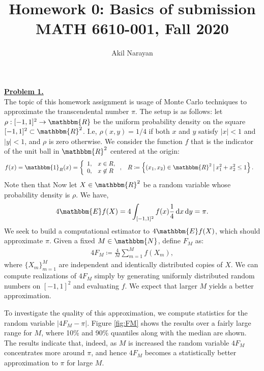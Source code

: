 \documentclass[11pt]{amsart}
\newcommand{\E}{\mathbbm{E}}
\newcommand{\R}{\mathbbm{R}}
\newcommand{\N}{\mathbbm{N}}
\newcommand{\mathd}{\mathrm{d}}
\newcommand{\dx}[1]{\,\mathd #1}
\begin{document}
\title{Homework 0: Basics of submission\\MATH 6610-001, Fall 2020}
\author{Akil Narayan}
\maketitle

\noindent \underline{\textbf{Problem 1.}}\\
The topic of this homework assignment is usage of Monte Carlo techniques to approximate the transcendental number $\pi$.  The setup is as follows: let $\rho : [-1,1]^2 \rightarrow \R$ be the uniform probability density on the square $[-1,1]^2 \subset \R^2$. I.e, $\rho(x,y) = 1/4$ if both $x$ and $y$ satisfy $|x| < 1$ and $|y| < 1$, and $\rho$ is zero otherwise. We consider the function $f$ that is the indicator of the unit ball in $\R^2$ centered at the origin:
\begin{align*}
  f(x) &= \mathbbm{1}_R(x) = \left\{ \begin{array}{rl} 1, & x \in R, \\ 0, & x \not\in R \end{array}\right.,
       & 
     R &\coloneqq \left\{ (x_1, x_2) \in \R^2\, \big|\, x_1^2 + x_2^2 \leq 1 \right\}.
\end{align*}
Note then that 
Now let $X \in \R^2$ be a random variable whose probability density is $\rho$. We have,
\begin{align*}
  4 \E f(X) = 4 \int_{[-1,1]^2} f(x) \frac{1}{4} \dx{x} \dx{y} = \pi.
\end{align*}
We seek to build a computational estimator to $4 \E f(X)$, which should approximate $\pi$. Given a fixed $M \in \N$, define $F_M$ as:
\begin{align}\label{eq:FM-def}
  4 F_M \coloneqq \frac{4}{M} \sum_{m=1}^M f(X_m),
\end{align}
where $\{X_m\}_{m=1}^M$ are independent and identically distributed copies of $X$. We can compute realizations of $4 F_M$ simply by generating uniformly distributed random numbers on $[-1,1]^2$ and evaluating $f$. We expect that larger $M$ yields a better approximation.

To investigate the quality of this approximation, we compute statistics for the random variable $\left| 4 F_M - \pi \right|$. Figure \ref{fig:FM} shows the results over a fairly large range for $M$, where 10\% and 90\% quantiles along with the median are shown. The results indicate that, indeed, as $M$ is increased the random variable $4 F_M$ concentrates more around $\pi$, and hence $4 F_M$ becomes a statistically better approximation to $\pi$ for large $M$. 
\end{document}

